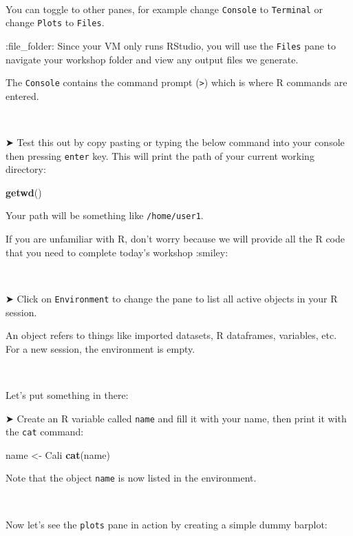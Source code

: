 \documentclass[
]{book}
\newenvironment{Shaded}{\begin{snugshade}}{\end{snugshade}}
\newcommand{\FunctionTok}[1]{\textcolor[rgb]{0.13,0.29,0.53}{\textbf{#1}}}
\newcommand{\NormalTok}[1]{#1}
\newcommand{\OtherTok}[1]{\textcolor[rgb]{0.56,0.35,0.01}{#1}}
\newcommand{\StringTok}[1]{\textcolor[rgb]{0.31,0.60,0.02}{#1}}
\begin{document}
~

You can toggle to other panes, for example change \texttt{Console} to \texttt{Terminal} or change \texttt{Plots} to \texttt{Files}.

:file\_folder: Since your VM only runs RStudio, you will use the \texttt{Files} pane to navigate your workshop folder and view any output files we generate.

The \texttt{Console} contains the command prompt (\texttt{\textgreater{}}) which is where R commands are entered.

~

➤ Test this out by copy pasting or typing the below command into your console then pressing \texttt{enter} key. This will print the path of your current working directory:

\begin{Shaded}
\begin{Highlighting}[]
\FunctionTok{getwd}\NormalTok{()}
\end{Highlighting}
\end{Shaded}

Your path will be something like \texttt{/home/user1}.

If you are unfamiliar with R, don't worry because we will provide all the R code that you need to complete today's workshop :smiley:

~

➤ Click on \texttt{Environment} to change the pane to list all active objects in your R session.

An object refers to things like imported datasets, R dataframes, variables, etc. For a new session, the environment is empty.

~

Let's put something in there:

➤ Create an R variable called \texttt{name} and fill it with your name, then print it with the \texttt{cat} command:

\begin{Shaded}
\begin{Highlighting}[]
\NormalTok{name }\OtherTok{\textless{}{-}} \StringTok{\textquotesingle{}Cali\textquotesingle{}}
\FunctionTok{cat}\NormalTok{(name)}
\end{Highlighting}
\end{Shaded}

Note that the object \texttt{name} is now listed in the environment.

~

Now let's see the \texttt{plots} pane in action by creating a simple dummy barplot:
\end{document}
